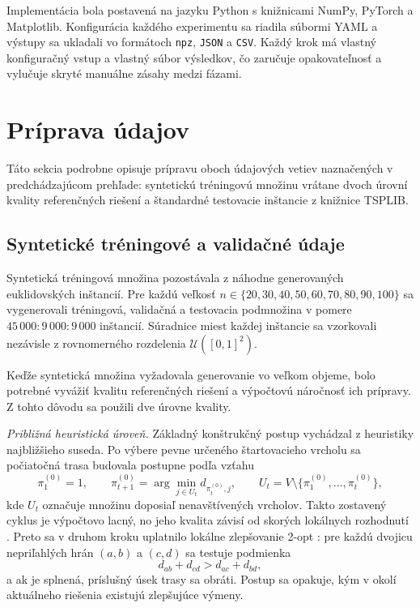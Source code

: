 \indent Implementácia bola postavená na jazyku Python s knižnicami NumPy,
PyTorch a Matplotlib. Konfigurácia každého experimentu sa riadila
súbormi YAML a výstupy sa ukladali vo formátoch \texttt{npz},
\texttt{JSON} a \texttt{CSV}. Každý krok má vlastný konfiguračný vstup
a vlastný súbor výsledkov, čo zaručuje opakovateľnosť a vylučuje
skryté manuálne zásahy medzi fázami.

\section{Príprava údajov}
\label{sec:priprava_udajov}

\indent Táto sekcia podrobne opisuje prípravu oboch údajových vetiev
naznačených v predchádzajúcom prehľade: syntetickú tréningovú množinu
vrátane dvoch úrovní kvality referenčných riešení a štandardné testovacie
inštancie z knižnice TSPLIB.

\subsection{Syntetické tréningové a validačné údaje}
\label{sec:synteticke_udaje}

\indent Syntetická tréningová množina pozostávala z náhodne generovaných
euklidovských inštancií. Pre každú veľkosť \(n \in \{20, 30, 40, 50, 60,
70, 80, 90, 100\}\) sa vygenerovali tréningová, validačná a testovacia
podmnožina v pomere \(45\,000 : 9\,000 : 9\,000\) inštancií. Súradnice
miest každej inštancie sa vzorkovali nezávisle z rovnomerného rozdelenia
\(\mathcal{U}([0,1]^2)\).

\indent Keďže syntetická množina vyžadovala generovanie vo veľkom objeme,
bolo potrebné vyvážiť kvalitu referenčných riešení a výpočtovú náročnosť
ich prípravy. Z tohto dôvodu sa použili dve úrovne kvality.

\indent \textit{Približná heuristická úroveň.}
Základný konštrukčný postup vychádzal z heuristiky najbližšieho suseda.
Po výbere pevne určeného štartovacieho vrcholu sa počiatočná trasa
budovala postupne podľa vzťahu
\begin{equation}
\pi^{(0)}_1 = 1, \qquad
\pi^{(0)}_{t+1}
=
\arg\min_{j \in U_t} d_{\pi^{(0)}_t,j},
\qquad
U_t = V \setminus \{\pi^{(0)}_1,\dots,\pi^{(0)}_t\},
\label{eq:nearest_neighbor}
\end{equation}
kde \(U_t\) označuje množinu doposiaľ nenavštívených vrcholov.
Takto zostavený cyklus je výpočtovo lacný, no jeho kvalita závisí od
skorých lokálnych rozhodnutí \parencite{matai2010overview}. Preto sa
v druhom kroku uplatnilo lokálne zlepšovanie 2-opt
\parencite{croes1958twoopt}: pre každú dvojicu nepriľahlých hrán
\((a,b)\) a \((c,d)\) sa testuje podmienka
\begin{equation}
d_{ab} + d_{cd} > d_{ac} + d_{bd},
\label{eq:two_opt_condition}
\end{equation}
a ak je splnená, príslušný úsek trasy sa obráti. Postup sa opakuje,
kým v okolí aktuálneho riešenia existujú zlepšujúce výmeny.

